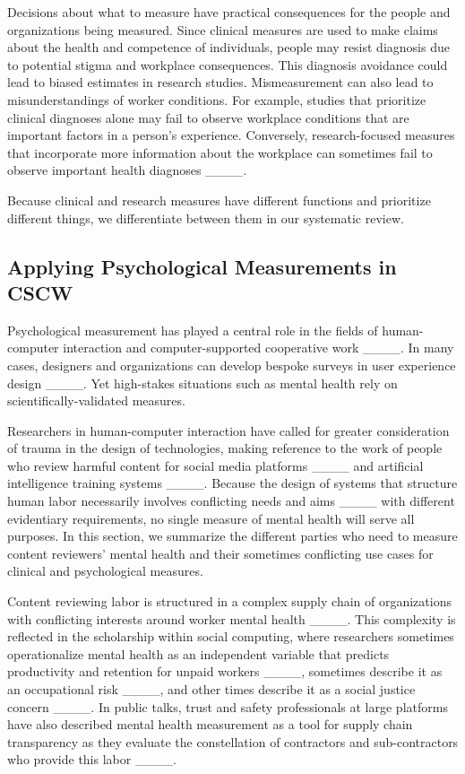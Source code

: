 Decisions about what to measure have practical consequences for the people and organizations being measured. Since clinical measures are used to make claims about the health and competence of individuals, people may resist diagnosis due to potential stigma and workplace consequences. This diagnosis avoidance could lead to biased estimates in research studies. Mismeasurement can also lead to misunderstandings of worker conditions. For example, studies that prioritize clinical diagnoses alone may fail to observe workplace conditions that are important factors in a person's experience. Conversely, research-focused measures that incorporate more information about the workplace can sometimes fail to observe important health diagnoses ____.

Because clinical and research measures have different functions and prioritize different things, we differentiate between them in our systematic review. 

\subsection{Applying Psychological Measurements in CSCW}
Psychological measurement has played a central role in the fields of human-computer interaction and computer-supported cooperative work ____. In many cases, designers and organizations can develop bespoke surveys in user experience design ____. Yet high-stakes situations such as mental health rely on scientifically-validated measures.

Researchers in human-computer interaction have called for greater consideration of trauma in the design of technologies, making reference to the work of people who review harmful content for social media platforms ____ and artificial intelligence training systems ____. Because the design of systems that structure human labor necessarily involves conflicting needs and aims ____ with different evidentiary requirements, no single measure of mental health will serve all purposes. In this section, we summarize the different parties who need to measure content reviewers' mental health and their sometimes conflicting use cases for clinical and psychological measures.

Content reviewing labor is structured in a complex supply chain of organizations with conflicting interests around worker mental health ____. This complexity is reflected in the scholarship within social computing, where researchers sometimes operationalize mental health as an independent variable that predicts productivity and retention for unpaid workers ____, sometimes describe it as an occupational risk ____, and other times describe it as a social justice concern ____. In public talks, trust and safety professionals at large platforms have also described mental health measurement as a tool for supply chain transparency as they evaluate the constellation of contractors and sub-contractors who provide this labor ____. 

